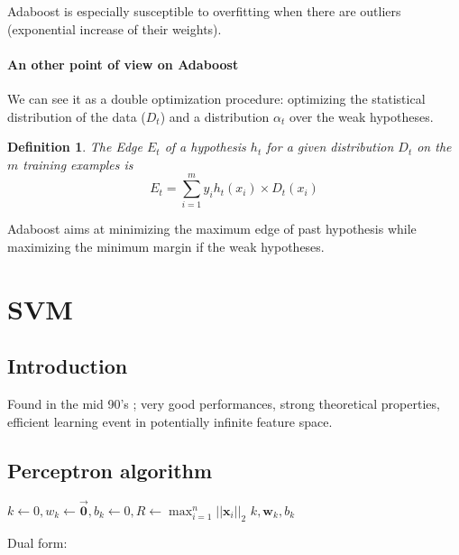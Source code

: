 \documentclass{article}
\newtheorem{defi}{Definition}
\begin{document}
Adaboost is especially susceptible to overfitting when there are outliers (exponential increase of their weights).


\paragraph{An other point of view on Adaboost}
We can see it as a double optimization procedure: optimizing the statistical distribution of the data ($D_t$) and a distribution $\alpha_t$ over the weak hypotheses.

\begin{defi}
The \emph{Edge} $E_t$ of a hypothesis $h_t$ for a given distribution $D_t$ on the $m$ training examples is
\[E_t = \sum_{i=1}^m y_i h_t(x_i) \times D_t(x_i)\]
\end{defi}

Adaboost aims at minimizing the maximum edge of past hypothesis while maximizing the minimum margin if the weak hypotheses.



\section{SVM}
\subsection{Introduction}
Found in the mid 90's ; very good performances, strong theoretical properties, efficient learning event in potentially infinite feature space.
\newpage

\subsection{Perceptron algorithm}
\begin{algorithm}[h]
$k\leftarrow0, w_k\leftarrow \vec{\mathbf{0}}, b_k \leftarrow 0, R \leftarrow \max_{i=1}^n ||\mathbf{x}_i||_2$
\Return $k,\mathbf{w}_k,b_k$

\end{algorithm}

Dual form:
\end{document}

